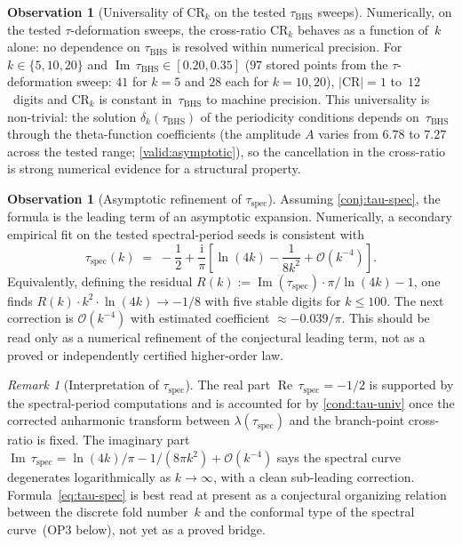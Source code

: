 \documentclass[11pt,a4paper]{article}
\theoremstyle{plain}
\theoremstyle{definition}
\newtheorem{observation}[theorem]{Observation}
\theoremstyle{remark}
\newtheorem{remark}[theorem]{Remark}
\DeclareMathOperator{\Real}{Re}
\DeclareMathOperator{\Imag}{Im}
\newcommand{\ii}{\mathrm{i}}
\newcommand{\Oo}{\mathcal{O}}
\begin{document}
\begin{observation}[Universality of $\mathrm{CR}_k$ on the tested
  $\tau_{\mathrm{BHS}}$ sweeps]
\label{obs:CR-universal}
Numerically, on the tested $\tau$-deformation sweeps, the cross-ratio
$\mathrm{CR}_k$ behaves as a function of~$k$ alone: no dependence on
$\tau_{\mathrm{BHS}}$ is resolved within numerical precision.
For $k \in \{5, 10, 20\}$ and
$\Imag\,\tau_{\mathrm{BHS}} \in [0.20, 0.35]$
($97$ stored points from the $\tau$-deformation sweep:
$41$ for $k=5$ and $28$ each for $k=10,20$),
$\lvert\mathrm{CR}\rvert = 1$ to~$12$~digits and 
$\mathrm{CR}_k$ is constant in~$\tau_{\mathrm{BHS}}$
to machine precision.
This universality is non-trivial: the solution
$\delta_k(\tau_{\mathrm{BHS}})$ of the periodicity conditions
depends on~$\tau_{\mathrm{BHS}}$ through the theta-function
coefficients (the amplitude $A$ varies from $6.78$ to $7.27$
across the tested range; \cref{valid:asymptotic}), so the
cancellation in the cross-ratio is strong numerical evidence for a
structural property.
\end{observation}

\begin{observation}[Asymptotic refinement of $\tau_{\mathrm{spec}}$]
\label{cor:tau-refined}
Assuming \cref{conj:tau-spec}, the formula is the leading term of an
asymptotic expansion.  Numerically, a secondary empirical fit on the
tested spectral-period seeds is consistent with
\begin{equation}\label{eq:tau-refined}
  \tau_{\mathrm{spec}}(k)
  \;=\; -\frac{1}{2}
  + \frac{\ii}{\pi}\!\left[
    \ln(4k) - \frac{1}{8k^2} + \Oo(k^{-4})
  \right].
\end{equation}
Equivalently, defining the residual
$R(k) := \Imag(\tau_{\mathrm{spec}})\cdot\pi/\ln(4k) - 1$,
one finds $R(k)\cdot k^2 \cdot \ln(4k) \to -1/8$
with five stable digits for $k \le 100$.
The next correction is $\Oo(k^{-4})$ with estimated
coefficient $\approx -0.039/\pi$.
This should be read only as a numerical refinement of the conjectural
leading term, not as a proved or independently certified higher-order
law.
\end{observation}

\begin{remark}[Interpretation of $\tau_{\mathrm{spec}}$]
\label{rem:tau-spec-meaning}
The real part $\Real\,\tau_{\mathrm{spec}} = -1/2$ is supported by the
spectral-period computations and is accounted for by
\cref{cond:tau-univ} once the corrected anharmonic transform between
$\lambda(\tau_{\mathrm{spec}})$ and the branch-point cross-ratio is fixed.
The imaginary part
$\Imag\,\tau_{\mathrm{spec}} = \ln(4k)/\pi - 1/(8\pi k^2)
+ \Oo(k^{-4})$
says the spectral curve degenerates logarithmically as
$k \to \infty$, with a clean sub-leading correction.
Formula~\eqref{eq:tau-spec} is best read at present as a conjectural
organizing relation between the discrete fold number~$k$ and the
conformal type of the spectral curve~(OP3 below), not yet as a proved
bridge.
\end{remark}
\end{document}
